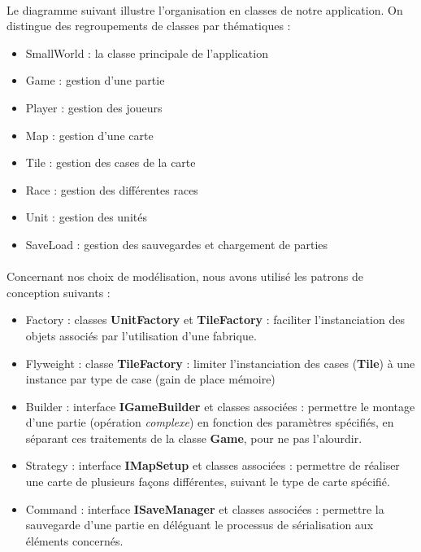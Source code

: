 \documentclass[a4paper]{article}
\begin{document}
\paragraph{}
Le diagramme suivant illustre l'organisation en classes de notre application.
On distingue des regroupements de classes par thématiques : 
\begin{itemize}
    \item SmallWorld : la classe principale de l'application
    \item Game : gestion d'une partie
    \item Player : gestion des joueurs
    \item Map : gestion d'une carte
    \item Tile : gestion des cases de la carte
    \item Race : gestion des différentes races
    \item Unit : gestion des unités
    \item SaveLoad : gestion des sauvegardes et chargement de parties
\end{itemize}

\paragraph{}
Concernant nos choix de modélisation, nous avons utilisé les patrons de conception suivants :
\begin{itemize}
    \item Factory : classes \textbf{UnitFactory} et \textbf{TileFactory} : faciliter l'instanciation des objets associés par l'utilisation d'une fabrique.
    \item Flyweight : classe \textbf{TileFactory} : limiter l'instanciation des cases (\textbf{Tile}) à une instance par type de case (gain de place mémoire)
    \item Builder : interface \textbf{IGameBuilder} et classes associées : permettre le montage d'une partie (opération \textit{complexe}) en fonction des paramètres spécifiés, en séparant ces traitements de la classe \textbf{Game}, pour ne pas l'alourdir.
    \item Strategy : interface \textbf{IMapSetup} et classes associées : permettre de réaliser une carte de plusieurs façons différentes, suivant le type de carte spécifié.
    \item Command : interface \textbf{ISaveManager} et classes associées : permettre la sauvegarde d'une partie en déléguant le processus de sérialisation aux éléments concernés.
\end{itemize}
\end{document}

